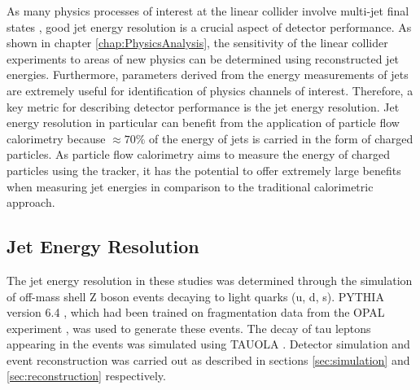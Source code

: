 As many physics processes of interest at the linear collider involve multi-jet final states \cite{Abramowicz:2016zbo}, good jet energy resolution is a crucial aspect of detector performance.    As shown in chapter \ref{chap:PhysicsAnalysis}, the sensitivity of the linear collider experiments to areas of new physics can be determined using reconstructed jet energies.  Furthermore, parameters derived from the energy measurements of jets are extremely useful for identification of physics channels of interest.  Therefore, a key metric for describing detector performance is the jet energy resolution.  Jet energy resolution in particular can benefit from the application of particle flow calorimetry because $\approx 70 \%$ of the energy of jets is carried in the form of charged particles.  As particle flow calorimetry aims to measure the energy of charged particles using the tracker, it has the potential to offer extremely large benefits when measuring jet energies in comparison to the traditional calorimetric approach.  


\subsection{Jet Energy Resolution}
The jet energy resolution in these studies was determined through the simulation of off-mass shell Z boson events decaying to light quarks (u, d, s).  PYTHIA version 6.4 \cite{Sjostrand:2006za}, which had been trained on fragmentation data from the OPAL experiment \cite{Alexander:1995bk}, was used to generate these events.  The decay of tau leptons appearing in the events was simulated using TAUOLA \cite{Was:2000st}.  Detector simulation and event reconstruction was carried out as described in sections \ref{sec:simulation} and \ref{sec:reconstruction} respectively.  

